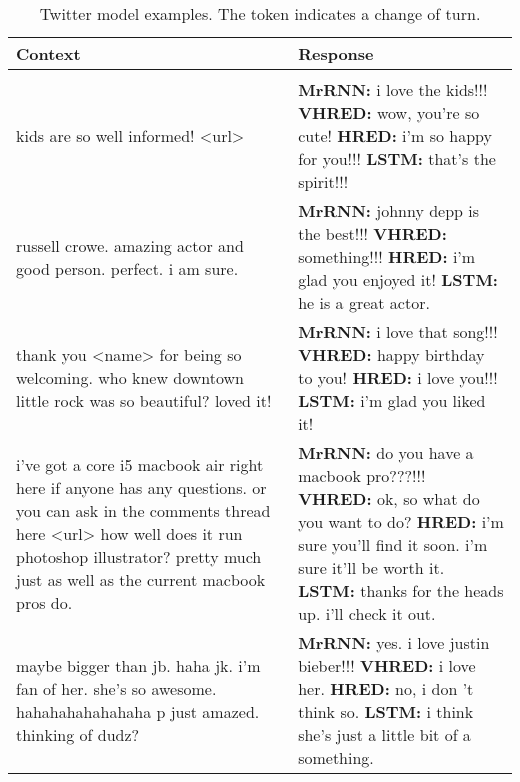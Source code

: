 \documentclass{article}
\begin{document}
\begin{table}[ht]
 \caption{Twitter model examples. The  token indicates a change of turn.}
 \label{table:twitter-examples}
 \scriptsize
 \centering
 \begin{tabular}{p{45mm}|p{80mm}}
 \textbf{Context} & \textbf{Response} \\ \hline \\ \hline 
     kids are so well informed! <url> & \textbf{MrRNN:} i love the kids!!!  \newline \textbf{VHRED:} wow, you're so cute! \newline \textbf{HRED:} i'm so happy for you!!! \newline \textbf{LSTM:} that's the spirit!!! \\ \hline 
     russell crowe. amazing actor and good person. perfect. i am sure. & \textbf{MrRNN:} johnny depp is the best!!!  \newline \textbf{VHRED:} something!!! \newline \textbf{HRED:} i'm glad you enjoyed it! \newline \textbf{LSTM:} he is a great actor. \\ \hline 
     thank you <name> for being so welcoming. who knew downtown little rock was so beautiful? loved it! & \textbf{MrRNN:} i love that song!!!  \newline \textbf{VHRED:} happy birthday to you! \newline \textbf{HRED:} i love you!!! \newline \textbf{LSTM:} i'm glad you liked it! \\ \hline 
     i've got a core i5 macbook air right here if anyone has any questions. or you can ask in the comments thread here <url>  how well does it run photoshop illustrator?  pretty much just as well as the current macbook pros do. & \textbf{MrRNN:} do you have a macbook pro???!!!  \newline \textbf{VHRED:} ok, so what do you want to do? \newline \textbf{HRED:} i'm sure you'll find it soon. i'm sure it'll be worth it. \newline \textbf{LSTM:} thanks for the heads up. i'll check it out.  \\ \hline 
     maybe bigger than jb. haha jk.  i'm fan of her. she's so awesome.  hahahahahahahaha p just amazed.  thinking of dudz? & \textbf{MrRNN:} yes. i love justin bieber!!!  \newline \textbf{VHRED:} i love her. \newline \textbf{HRED:} no, i don 't think so. \newline \textbf{LSTM:} i think she's just a little bit of a something.  \\ \hline 

\end{tabular}
\end{table}
\end{document}
